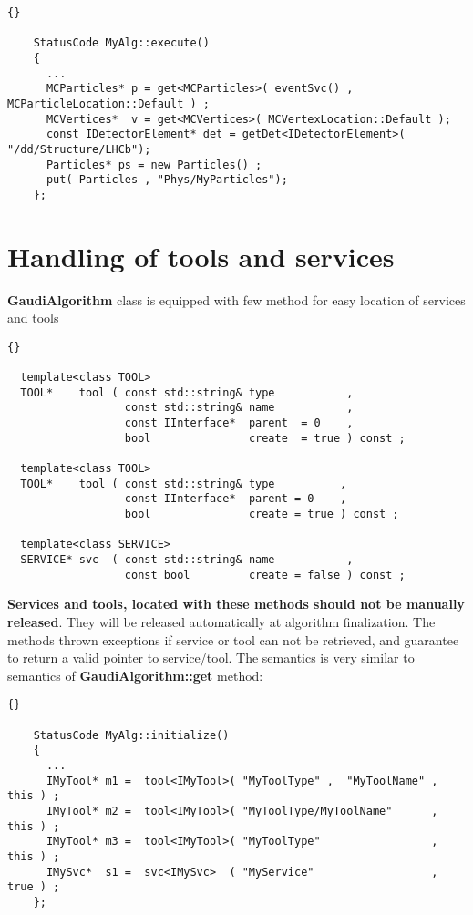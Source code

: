 \documentclass{lhcbnote}
\newcommand{\bftt}         {\ttfamily\bfseries}
\begin{document}
\begin{scriptsize}
 \begin{lstlisting}{}

    StatusCode MyAlg::execute()
    {
      ...
      MCParticles* p = get<MCParticles>( eventSvc() , MCParticleLocation::Default ) ;
      MCVertices*  v = get<MCVertices>( MCVertexLocation::Default );
      const IDetectorElement* det = getDet<IDetectorElement>( "/dd/Structure/LHCb");
      Particles* ps = new Particles() ;
      put( Particles , "Phys/MyParticles");
    };

 \end{lstlisting}
\end{scriptsize}


\section{Handling of tools and services}

{\bftt{GaudiAlgorithm}} class is equipped with few method for
easy location of services and tools

\begin{scriptsize}
 \begin{lstlisting}{}

  template<class TOOL>
  TOOL*    tool ( const std::string& type           ,
                  const std::string& name           ,
                  const IInterface*  parent  = 0    ,
                  bool               create  = true ) const ;

  template<class TOOL>
  TOOL*    tool ( const std::string& type          ,
                  const IInterface*  parent = 0    ,
                  bool               create = true ) const ;

  template<class SERVICE>
  SERVICE* svc  ( const std::string& name           ,
                  const bool         create = false ) const ;

 \end{lstlisting}
\end{scriptsize}

{\bf{Services and tools, located with these methods should not
be manually released}}. They will be released automatically
at algorithm finalization. The methods thrown exceptions if
service or tool can not be retrieved, and guarantee to
return a valid pointer to service/tool.
The semantics is very similar to semantics of
{\bftt{GaudiAlgorithm::get}} method:

\begin{scriptsize}
 \begin{lstlisting}{}

    StatusCode MyAlg::initialize()
    {
      ...
      IMyTool* m1 =  tool<IMyTool>( "MyToolType" ,  "MyToolName" , this ) ;
      IMyTool* m2 =  tool<IMyTool>( "MyToolType/MyToolName"      , this ) ;
      IMyTool* m3 =  tool<IMyTool>( "MyToolType"                 , this ) ;
      IMySvc*  s1 =  svc<IMySvc>  ( "MyService"                  , true ) ;
    };

 \end{lstlisting}
\end{scriptsize}
\end{document}
